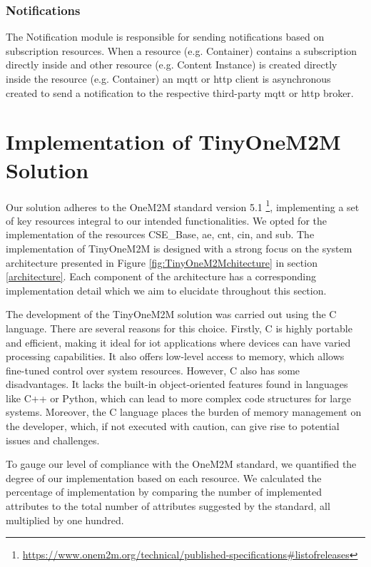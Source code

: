 \documentclass[a4paper,fleqn]{cas-dc}
\begin{document}
\subsubsection{Notifications}

The Notification module is responsible for sending notifications based on subscription resources. When a resource (e.g. Container) contains a subscription directly inside and other resource (e.g. Content Instance) is created directly inside the resource (e.g. Container) an \gls{mqtt} or \gls{http} client is asynchronous created to send a notification to the respective third-party \gls{mqtt} or \gls{http} broker.

\section{Implementation of TinyOneM2M Solution} \label{sec:tinyonem2msolution}

Our solution adheres to the OneM2M standard version 5.1 \footnote{\url{https://www.onem2m.org/technical/published-specifications\#listofreleases}}, implementing a set of key resources integral to our intended functionalities. We opted for the implementation of the resources CSE\_Base, \gls{ae}, \gls{cnt}, \gls{cin}, and \gls{sub}. The implementation of TinyOneM2M is designed with a strong focus on the system architecture presented in Figure \ref{fig:TinyOneM2Mchitecture} in section \ref{architecture}. Each component of the architecture has a corresponding implementation detail which we aim to elucidate throughout this section.

The development of the TinyOneM2M solution was carried out using the C language. There are several reasons for this choice. Firstly, C is highly portable and efficient, making it ideal for \gls{iot} applications where devices can have varied processing capabilities. It also offers low-level access to memory, which allows fine-tuned control over system resources. However, C also has some disadvantages. It lacks the built-in object-oriented features found in languages like C++ or Python, which can lead to more complex code structures for large systems. Moreover, the C language places the burden of memory management on the developer, which, if not executed with caution, can give rise to potential issues and challenges.

To gauge our level of compliance with the OneM2M standard, we quantified the degree of our implementation based on each resource. We calculated the percentage of implementation by comparing the number of implemented attributes to the total number of attributes suggested by the standard, all multiplied by one hundred.
\end{document}
